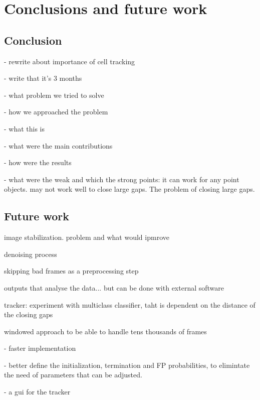 		
\chapter{Conclusions and future work}
\label{chap:conclusion}

\section{Conclusion \statusnew}
\label{sec:conclusion_conclusion}

- rewrite about importance of cell tracking

- write that it's 3 months 


- what problem we tried to solve

- how we approached the problem

- what this is

- what were the main contributions

- how were the results

- what were the weak and which the strong points: it can work for any point objects. may not work well to close large gaps. The problem of closing large gaps.



\section{Future work }
\label{sec:conclusion_futurework}

image stabilization. problem and what would ipmrove

denoising process

skipping bad frames as a preprocessing step

outputs that analyse the data... but can be done with external software

tracker: experiment with multiclass classifier, taht is dependent on the distance of the closing gaps

windowed approach to be able to handle tens thousands of frames

- faster implementation

- better define the initialization, termination and FP probabilities, to elimintate the need of parameters that can be adjusted.

- a gui for the tracker

